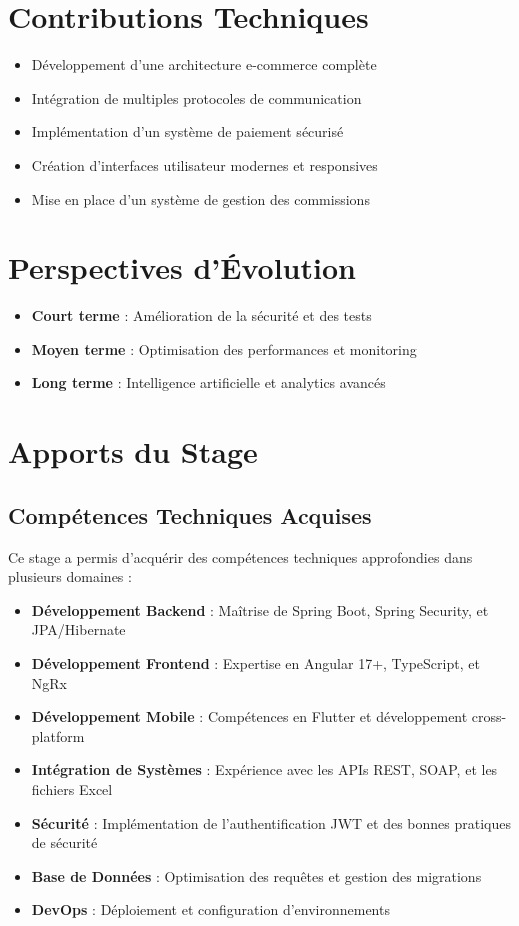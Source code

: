 \documentclass[12pt,a4paper]{report}
\begin{document}
\section{Contributions Techniques}

\begin{itemize}
    \item Développement d'une architecture e-commerce complète
    \item Intégration de multiples protocoles de communication
    \item Implémentation d'un système de paiement sécurisé
    \item Création d'interfaces utilisateur modernes et responsives
    \item Mise en place d'un système de gestion des commissions
\end{itemize}

\section{Perspectives d'Évolution}

\begin{itemize}
    \item \textbf{Court terme} : Amélioration de la sécurité et des tests
    \item \textbf{Moyen terme} : Optimisation des performances et monitoring
    \item \textbf{Long terme} : Intelligence artificielle et analytics avancés
\end{itemize}

\section{Apports du Stage}

\subsection{Compétences Techniques Acquises}

Ce stage a permis d'acquérir des compétences techniques approfondies dans plusieurs domaines :

\begin{itemize}
    \item \textbf{Développement Backend} : Maîtrise de Spring Boot, Spring Security, et JPA/Hibernate
    \item \textbf{Développement Frontend} : Expertise en Angular 17+, TypeScript, et NgRx
    \item \textbf{Développement Mobile} : Compétences en Flutter et développement cross-platform
    \item \textbf{Intégration de Systèmes} : Expérience avec les APIs REST, SOAP, et les fichiers Excel
    \item \textbf{Sécurité} : Implémentation de l'authentification JWT et des bonnes pratiques de sécurité
    \item \textbf{Base de Données} : Optimisation des requêtes et gestion des migrations
    \item \textbf{DevOps} : Déploiement et configuration d'environnements
\end{itemize}
\end{document}
